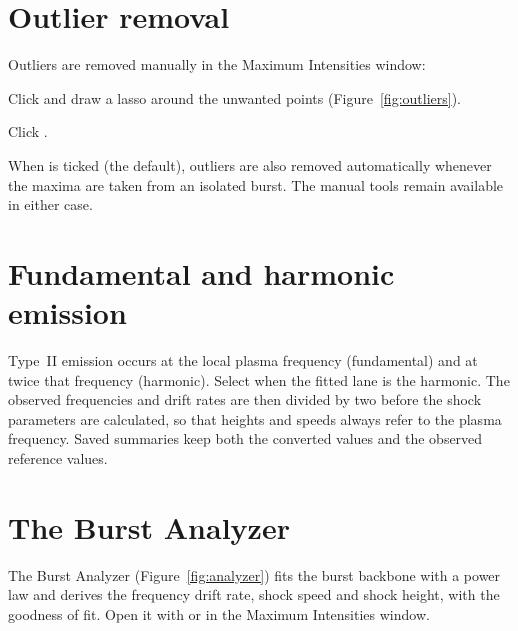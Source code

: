 
\section{Outlier removal}
\label{sec:outliers}

Outliers are removed manually in the Maximum Intensities window:
\begin{steps}
  \item Click  and draw a lasso around the unwanted points
    (Figure~\ref{fig:outliers}).
  \item Click .
\end{steps}


When  is ticked
(the default), outliers are also removed automatically whenever the maxima are taken from
an isolated burst. The manual tools remain available in either case.

\section{Fundamental and harmonic emission}
\label{sec:harmonic}

Type~II emission occurs at the local plasma frequency (fundamental) and at twice that
frequency (harmonic). Select  when the fitted lane is the harmonic. The
observed frequencies and drift rates are then divided by two before the shock parameters
are calculated, so that heights and speeds always refer to the plasma frequency. Saved
summaries keep both the converted values and the observed reference values.

\section{The Burst Analyzer}
\label{sec:analyzer}

The Burst Analyzer (Figure~\ref{fig:analyzer}) fits the burst backbone with a power law and
derives the frequency drift rate, shock speed and shock height, with the goodness of fit.
Open it with  or  in the Maximum
Intensities window.


